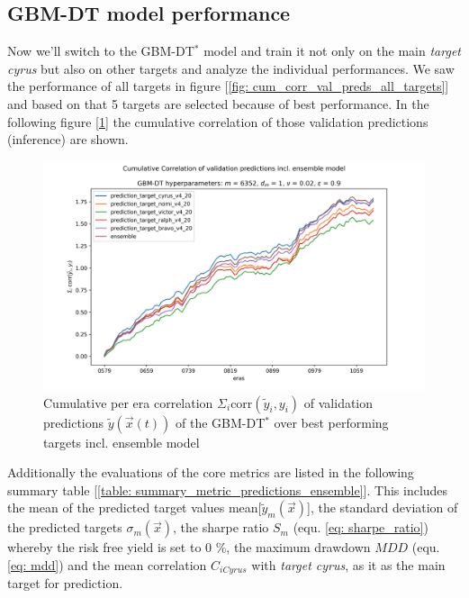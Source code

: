 \documentclass[12pt, a4paper]{article}
\begin{document}
\subsection{GBM-DT model performance}
Now we'll switch to the GBM-DT$^{\ast}$ model and train it not only on the main \textit{target cyrus} but also on other targets and analyze the individual performances. We saw the performance of all targets in figure [\ref{fig: cum_corr_val_preds_all_targets}] and based on that 5 targets are selected because of best performance. In the following figure [\ref{fig: cum_corr_val_preds_ensemble}] the cumulative correlation of those validation predictions (inference) are shown.
\begin{figure}[!htpb]
    \centering
    \includegraphics[width=1\textwidth,trim={0 0 0 0},clip]{rounds/2024-01-17_round1_cumulative_correlation_of_validation_predicitions_ensemble.png}
    \caption[Cumulative per era correlation of validation predictions over the GBM-DT$^{\ast}$ ensemble model with comparison]{Cumulative per era correlation $\Sigma_i \text{corr}(\tilde{y}_i,y_i)$ of validation predictions $\tilde{y}(\vec{x}(t))$ of the GBM-DT$^{\ast}$ over best performing targets incl. ensemble model}
    \label{fig: cum_corr_val_preds_ensemble}
\end{figure}
Additionally the evaluations of the core metrics are listed in the following summary table [\ref{table: summary_metric_predictions_ensemble}]. This includes the mean of the predicted target values mean[$\tilde{y}_m(\vec{x})$], the standard deviation of the predicted targets $\sigma_m(\vec{x})$, the sharpe ratio $S_m$ (equ. \ref{eq: sharpe_ratio}) whereby the risk free yield is set to 0 \%, the maximum drawdown $MDD$ (equ. \ref{eq: mdd}) and the mean correlation $C_{iCyrus}$ with \textit{target cyrus}, as it as the main target for prediction.
\end{document}
